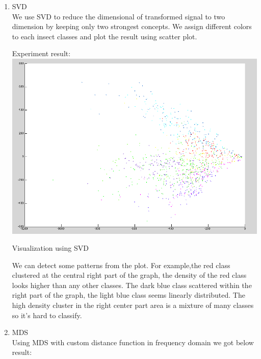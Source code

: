 \begin{enumerate}
\begin{enumerate}
\item SVD\\
We use SVD to reduce the dimensional of transformed signal to two dimension by keeping only two strongest concepts. We assign different colors to each insect classes and plot the result using scatter plot.
\begin{center}
Experiment result:\\
\includegraphics[scale=.4]{PIC/fftsvdplot.png}
\caption{Visualization using SVD}
\end{center}
\begin{flushleft}We can detect some patterns from the plot. For example,the red class clustered at the central right part of the graph, the density of the red class looks higher than any other classes. The dark blue class scattered within the right part of the graph, the light blue class seems linearly distributed. The high density cluster in the right center part area is a mixture of many classes so it's hard to classify.
\end{flushleft}


\item MDS\\
Using MDS with custom distance function in frequency domain we got below result:


\end{enumerate}
\end{enumerate}
